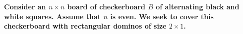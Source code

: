 \textbf{Consider an $n \times n$ board of checkerboard $B$ of alternating black and white squares. Assume that $n$ is even. We seek to cover this checkerboard with rectangular dominos of size $2 \times 1$.}\vspace{.2cm}

\textcolor{bibi}{}
\begin{quote}
\end{quote}